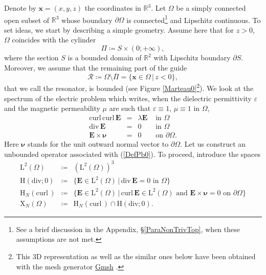 \documentclass[11pt,a4paper]{article}
\newcommand{\eps}{\varepsilon}
\newcommand{\Om}{\Omega}
\newcommand{\mrm}[1]{\mathrm{#1}}
\newcommand{\bfx}{\boldsymbol{x}}
\newcommand{\bfnu}{\boldsymbol{\nu}}
\newcommand{\R}{\mathbb{R}}
\newcommand{\mL}{\mrm{L}}
\newcommand{\mH}{\mrm{H}}
\newcommand{\mX}{\mrm{X}}
\newcommand{\curlvec}{\boldsymbol{\mrm{curl}}\,}
\renewcommand{\div}{\mrm{div}}
\def\E{\boldsymbol{E}}
\begin{document}
Denote by $\bfx=(x,y,z)$ the coordinates in $\R^3$. Let $\Om$ be a simply connected open subset of $\R^3$ whose boundary $\partial\Om$ is connected\footnote{See a brief discussion in the Appendix, \S\ref{ParaNonTrivTop}, when these assumptions are not met.} and Lipschitz continuous. To set ideas, we start by describing a simple geometry. Assume here that for $z>0$, $\Om$ coincides with the cylinder 
\begin{equation}\label{DefOm1}
\Pi\coloneqq S\times(0;+\infty),
\end{equation}
where the section $S$ is a bounded domain of $\R^2$ with Lipschitz boundary $\partial S$. Moreover, we assume that the remaining part of the guide
\begin{equation}\label{DefOm2}
\mathcal{R}\coloneqq\Om\setminus\overline{\Pi}=\{\bfx\in\Om\,|\,z<0\},
\end{equation}
that we call the resonator, is bounded (see Figure \ref{Marteau0}\footnote{This 3D representation as well as the similar ones below have been obtained with the mesh generator \href{https://gmsh.info/}{Gmsh} \cite{GeRe09}.}). We look at the spectrum of the electric problem which writes, when the dielectric permittivity $\eps$ and the magnetic permeability $\mu$ are such that $\eps\equiv1$, $\mu\equiv1$ in $\Om$, 
\begin{equation}\label{DefPb0}
\begin{array}{|rcll}
\curlvec\curlvec\E&=&\lambda\E&\mbox{ in }\Om\\[2pt]
\div\,\E&=&0&\mbox{ in }\Om\\[2pt]
\E\times\bfnu&=&0&\mbox{ on }\partial\Om.
\end{array}
\end{equation}
Here $\bfnu$ stands for the unit outward normal vector to $\partial\Om$. Let us construct an unbounded operator associated with (\ref{DefPb0}). To proceed, introduce the spaces 
\begin{equation}\label{DefSobolev}
\begin{array}{rcl}
\boldsymbol{\mL}^2(\Om)&\coloneqq&(\mL^2(\Om))^3\\[3pt]
\boldsymbol{\mH}(\div;0)&\coloneqq&\{\E\in\boldsymbol{\mL}^2(\Om)\,|\,\div\,\E=0\mbox{ in }\Om\}\\[3pt]
\boldsymbol{\mH}_N(\curlvec)&\coloneqq&\{\E\in\boldsymbol{\mL}^2(\Om)\,|\,\curlvec\E\in\boldsymbol{\mL}^2(\Om)\mbox{ and }\E\times\bfnu=0\mbox{ on }\partial\Om\}\\[3pt]
\boldsymbol{\mX}_N(\Om)&\coloneqq&\boldsymbol{\mH}_N(\curlvec)\cap\boldsymbol{\mH}(\div;0).
\end{array}
\end{equation}
\end{document}
